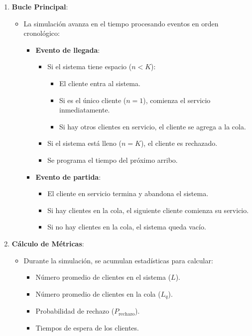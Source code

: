 \documentclass{article}
\begin{document}
\begin{enumerate}
    \item \textbf{Bucle Principal}:
    \begin{itemize}
        \item La simulación avanza en el tiempo procesando eventos en orden cronológico:
        \begin{itemize}
            \item \textbf{Evento de llegada}:
            \begin{itemize}
                \item Si el sistema tiene espacio (\(n < K\)):
                \begin{itemize}
                    \item El cliente entra al sistema.
                    \item Si es el único cliente (\(n = 1\)), comienza el servicio inmediatamente.
                    \item Si hay otros clientes en servicio, el cliente se agrega a la cola.
                \end{itemize}
                \item Si el sistema está lleno (\(n = K\)), el cliente es rechazado.
                \item Se programa el tiempo del próximo arribo.
            \end{itemize}
            \item \textbf{Evento de partida}:
            \begin{itemize}
                \item El cliente en servicio termina y abandona el sistema.
                \item Si hay clientes en la cola, el siguiente cliente comienza su servicio.
                \item Si no hay clientes en la cola, el sistema queda vacío.
            \end{itemize}
        \end{itemize}
    \end{itemize}

    \item \textbf{Cálculo de Métricas}:
    \begin{itemize}
        \item Durante la simulación, se acumulan estadísticas para calcular:
        \begin{itemize}
            \item Número promedio de clientes en el sistema (\(L\)).
            \item Número promedio de clientes en la cola (\(L_q\)).
            \item Probabilidad de rechazo (\(P_{\text{rechazo}}\)).
            \item Tiempos de espera de los clientes.
        \end{itemize}
    \end{itemize}


\end{enumerate}
\end{document}
